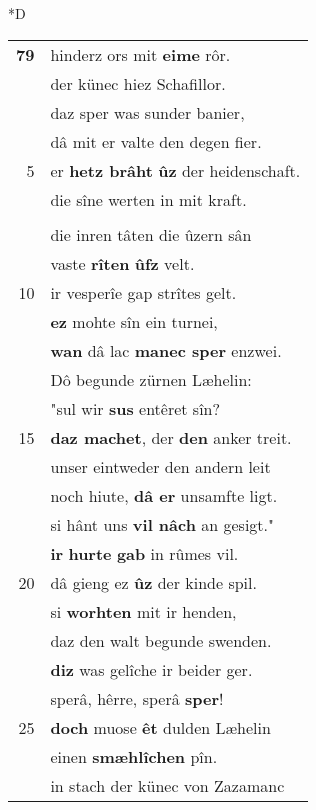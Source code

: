 \documentclass[8pt,a4paper,notitlepage]{article}
\begin{document}
\begin{table}[ht]
\begin{minipage}[t]{0.5\linewidth}
\small
\begin{center}*D
\end{center}
\begin{tabular}{rl}
\textbf{79} & hinderz ors mit \textbf{eime} rôr.\\ 
 & der künec hiez Schafillor.\\ 
 & daz sper was sunder banier,\\ 
 & dâ mit er valte den degen fier.\\ 
5 & er \textbf{hetz brâht} \textbf{ûz} der heidenschaft.\\ 
 & die sîne werten in mit kraft.\\ 
 & \textbf{\begin{large}D\end{large}och} vieng er den werden man.\\ 
 & die inren tâten die ûzern sân\\ 
 & vaste \textbf{rîten} \textbf{ûfz} velt.\\ 
10 & ir vesperîe gap strîtes gelt.\\ 
 & \textbf{ez} mohte sîn ein turnei,\\ 
 & \textbf{wan} dâ lac \textbf{manec sper} enzwei.\\ 
 & Dô begunde zürnen Læhelin:\\ 
 & "sul wir \textbf{sus} entêret sîn?\\ 
15 & \textbf{daz machet}, der \textbf{den} anker treit.\\ 
 & unser eintweder den andern leit\\ 
 & noch hiute, \textbf{dâ er} unsamfte ligt.\\ 
 & si hânt uns \textbf{vil nâch} an gesigt."\\ 
 & \textbf{ir} \textbf{hurte} \textbf{gab} in rûmes vil.\\ 
20 & dâ gieng ez \textbf{ûz} der kinde spil.\\ 
 & si \textbf{worhten} mit ir henden,\\ 
 & daz den walt begunde swenden.\\ 
 & \textbf{diz} was gelîche ir beider ger.\\ 
 & sperâ, hêrre, sperâ \textbf{sper}!\\ 
25 & \textbf{doch} muose \textbf{êt} dulden Læhelin\\ 
 & einen \textbf{smæhlîchen} pîn.\\ 
 & in stach der künec von Zazamanc\\ 

\end{tabular}
\end{minipage}
\end{table}
\end{document}
